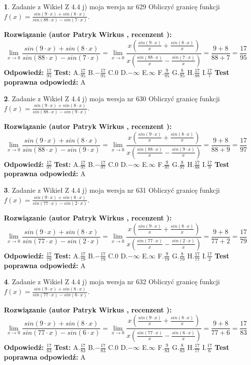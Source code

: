 \documentclass[12pt, a4paper]{article}
\theoremstyle{definition} %
\newtheorem{zad}{}
\newcommand{\zadStart}[1]{\begin{zad}#1\newline}
\newcommand{\zadStop}{\end{zad}}
\newcommand{\rozwStart}[2]{\noindent \textbf{Rozwiązanie (autor #1 , recenzent #2): }\newline}
\newcommand{\rozwStop}{\newline}
\newcommand{\odpStart}{\noindent \textbf{Odpowiedź:}\newline}
\newcommand{\odpStop}{\newline}
\newcommand{\testStart}{\noindent \textbf{Test:}\newline}
\newcommand{\testStop}{\newline}
\newcommand{\kluczStart}{\noindent \textbf{Test poprawna odpowiedź:}\newline}
\newcommand{\kluczStop}{\newline}
\begin{document}
\zadStart{Zadanie z Wikieł Z 4.4 j) moja wersja nr 629}
Obliczyć granicę funkcji $f(x)=\frac{sin(9\cdot x) +sin(8\cdot x)}{sin(88\cdot x) -sin(7\cdot x)}$.
\zadStop
\rozwStart{Patryk Wirkus}{}
$$\lim\limits_{x\to 0}\frac{sin(9\cdot x) +sin(8\cdot x)}{sin(88\cdot x) -sin(7\cdot x)}=\lim\limits_{x\to 0}\frac{x(\frac{sin(9\cdot x)}{x}+\frac{sin(8\cdot x)}{x})}{x(\frac{sin(88\cdot x)}{x}-\frac{sin(7\cdot x)}{x})}=\frac{9+8}{88+7} = \frac{17}{95}$$
\rozwStop
\odpStart
$\frac{17}{95}$
\odpStop
\testStart
A.$\frac{17}{95}$
B.$-\frac{17}{95}$
C.$0$
D.$-\infty$
E.$\infty$
F.$\frac{9}{95}$
G.$\frac{8}{95}$
H.$\frac{17}{88}$
I.$\frac{17}{7}$
\testStop
\kluczStart
A
\kluczStop



\zadStart{Zadanie z Wikieł Z 4.4 j) moja wersja nr 630}
Obliczyć granicę funkcji $f(x)=\frac{sin(9\cdot x) +sin(8\cdot x)}{sin(88\cdot x) -sin(9\cdot x)}$.
\zadStop
\rozwStart{Patryk Wirkus}{}
$$\lim\limits_{x\to 0}\frac{sin(9\cdot x) +sin(8\cdot x)}{sin(88\cdot x) -sin(9\cdot x)}=\lim\limits_{x\to 0}\frac{x(\frac{sin(9\cdot x)}{x}+\frac{sin(8\cdot x)}{x})}{x(\frac{sin(88\cdot x)}{x}-\frac{sin(9\cdot x)}{x})}=\frac{9+8}{88+9} = \frac{17}{97}$$
\rozwStop
\odpStart
$\frac{17}{97}$
\odpStop
\testStart
A.$\frac{17}{97}$
B.$-\frac{17}{97}$
C.$0$
D.$-\infty$
E.$\infty$
F.$\frac{9}{97}$
G.$\frac{8}{97}$
H.$\frac{17}{88}$
I.$\frac{17}{9}$
\testStop
\kluczStart
A
\kluczStop



\zadStart{Zadanie z Wikieł Z 4.4 j) moja wersja nr 631}
Obliczyć granicę funkcji $f(x)=\frac{sin(9\cdot x) +sin(8\cdot x)}{sin(77\cdot x) -sin(2\cdot x)}$.
\zadStop
\rozwStart{Patryk Wirkus}{}
$$\lim\limits_{x\to 0}\frac{sin(9\cdot x) +sin(8\cdot x)}{sin(77\cdot x) -sin(2\cdot x)}=\lim\limits_{x\to 0}\frac{x(\frac{sin(9\cdot x)}{x}+\frac{sin(8\cdot x)}{x})}{x(\frac{sin(77\cdot x)}{x}-\frac{sin(2\cdot x)}{x})}=\frac{9+8}{77+2} = \frac{17}{79}$$
\rozwStop
\odpStart
$\frac{17}{79}$
\odpStop
\testStart
A.$\frac{17}{79}$
B.$-\frac{17}{79}$
C.$0$
D.$-\infty$
E.$\infty$
F.$\frac{9}{79}$
G.$\frac{8}{79}$
H.$\frac{17}{77}$
I.$\frac{17}{2}$
\testStop
\kluczStart
A
\kluczStop



\zadStart{Zadanie z Wikieł Z 4.4 j) moja wersja nr 632}
Obliczyć granicę funkcji $f(x)=\frac{sin(9\cdot x) +sin(8\cdot x)}{sin(77\cdot x) -sin(6\cdot x)}$.
\zadStop
\rozwStart{Patryk Wirkus}{}
$$\lim\limits_{x\to 0}\frac{sin(9\cdot x) +sin(8\cdot x)}{sin(77\cdot x) -sin(6\cdot x)}=\lim\limits_{x\to 0}\frac{x(\frac{sin(9\cdot x)}{x}+\frac{sin(8\cdot x)}{x})}{x(\frac{sin(77\cdot x)}{x}-\frac{sin(6\cdot x)}{x})}=\frac{9+8}{77+6} = \frac{17}{83}$$
\rozwStop
\odpStart
$\frac{17}{83}$
\odpStop
\testStart
A.$\frac{17}{83}$
B.$-\frac{17}{83}$
C.$0$
D.$-\infty$
E.$\infty$
F.$\frac{9}{83}$
G.$\frac{8}{83}$
H.$\frac{17}{77}$
I.$\frac{17}{6}$
\testStop
\kluczStart
A
\kluczStop
\end{document}
